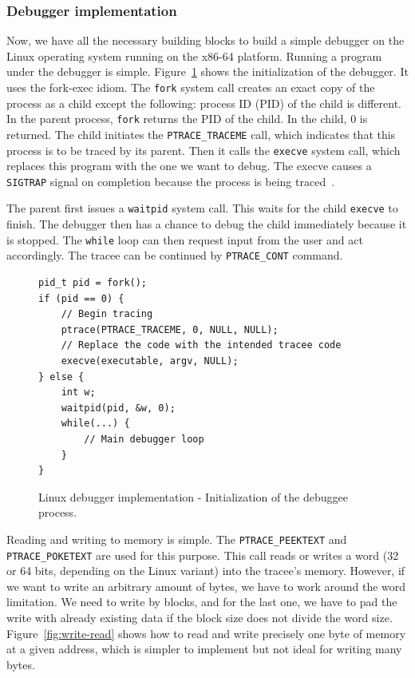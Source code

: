 \subsubsection{Debugger implementation}
Now, we have all the necessary building blocks to build a simple debugger on
the Linux operating system running on the x86-64 platform. Running a program
under the debugger is simple. Figure~\ref{fig:debugger-init} shows the
initialization of the debugger. It uses the fork-exec idiom. The \texttt{fork}
system call creates an exact copy of the process as a child except the
following: process ID (PID) of the child is different. In the parent process,
\texttt{fork} returns the PID of the child. In the child, $0$ is returned. The
child initiates the \texttt{PTRACE\_TRACEME} call, which indicates that this
process is to be traced by its parent. Then it calls the \texttt{execve} system
call, which replaces this program with the one we want to debug. The execve
causes a \texttt{SIGTRAP} signal on completion because the process is being
traced~\cite{execve}.

The parent first issues a \texttt{waitpid} system call. This waits for the
child \texttt{execve} to finish. The debugger then has a chance to debug the
child immediately because it is stopped. The \texttt{while} loop can then
request input from the user and act accordingly. The tracee can be continued by
\texttt{PTRACE\_CONT} command.

\begin{figure}
    \begin{verbatim}
pid_t pid = fork();
if (pid == 0) {
    // Begin tracing
    ptrace(PTRACE_TRACEME, 0, NULL, NULL);
    // Replace the code with the intended tracee code
    execve(executable, argv, NULL);
} else {
    int w;
    waitpid(pid, &w, 0);
    while(...) {
        // Main debugger loop
    }
}
    \end{verbatim}
    \caption{Linux debugger implementation - Initialization of the debuggee
    process.}
    \label{fig:debugger-init}
\end{figure}

Reading and writing to memory is simple. The \texttt{PTRACE\_PEEKTEXT} and
\texttt{PTRACE\_POKETEXT} are used for this purpose. This call reads or writes
a word (32 or 64 bits, depending on the Linux variant) into the tracee's
memory. However, if we want to write an arbitrary amount of bytes, we have to
work around the word limitation. We need to write by blocks, and for the last
one, we have to pad the write with already existing data if the block size does
not divide the word size. Figure~\ref{fig:write-read} shows how to read and
write precisely one byte of memory at a given address, which is simpler to
implement but not ideal for writing many bytes.


